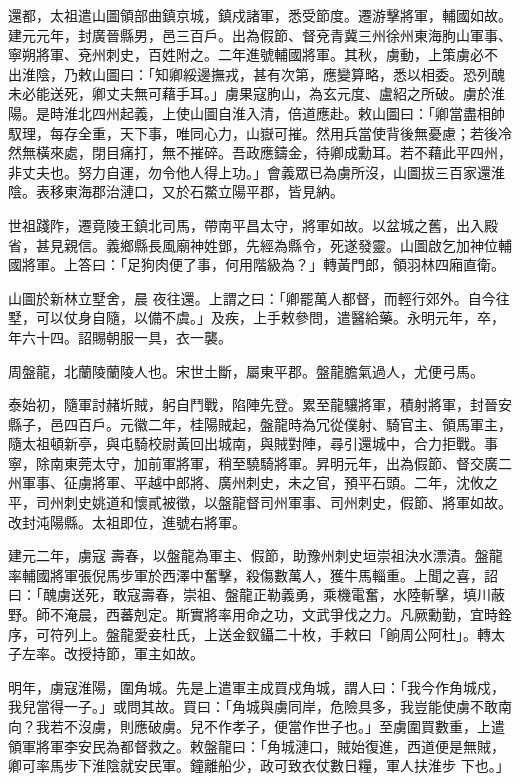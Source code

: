 \begin{pinyinscope}
 還都，太祖遣山圖領部曲鎮京城，鎮戍諸軍，悉受節度。遷游擊將軍，輔國如故。建元元年，封廣晉縣男，邑三百戶。出為假節、督兗青冀三州徐州東海朐山軍事、寧朔將軍、兗州刺史，百姓附之。二年進號輔國將軍。其秋，虜動，上策虜必不
 出淮陰，乃敕山圖曰：「知卿綏邊撫戎，甚有次第，應變算略，悉以相委。恐列醜未必能送死，卿丈夫無可藉手耳。」虜果寇朐山，為玄元度、盧紹之所破。虜於淮陽。是時淮北四州起義，上使山圖自淮入清，倍道應赴。敕山圖曰：「卿當盡相帥馭理，每存全重，天下事，唯同心力，山嶽可摧。然用兵當使背後無憂慮；若後冷然無橫來處，閉目痛打，無不摧碎。吾政應鑄金，待卿成勳耳。若不藉此平四州，非丈夫也。努力自運，勿令他人得上功。」會義眾已為虜所沒，山圖拔三百家還淮陰。表移東海郡治漣口，又於石鱉立陽平郡，皆見納。



 世祖踐阼，遷竟陵王鎮北司馬，帶南平昌太守，將軍如故。以盆城之舊，出入殿省，甚見親信。義鄉縣長風廟神姓鄧，先經為縣令，死遂發靈。山圖啟乞加神位輔國將軍。上答曰：「足狗肉便了事，何用階級為？」轉黃門郎，領羽林四廂直衛。



 山圖於新林立墅舍，晨
 夜往還。上謂之曰：「卿罷萬人都督，而輕行郊外。自今往墅，可以仗身自隨，以備不虞。」及疾，上手敕參問，遣醫給藥。永明元年，卒，年六十四。詔賜朝服一具，衣一襲。



 周盤龍，北蘭陵蘭陵人也。宋世土斷，屬東平郡。盤龍膽氣過人，尤便弓馬。



 泰始初，隨軍討赭圻賊，躬自鬥戰，陷陣先登。累至龍驤將軍，積射將軍，封晉安縣子，邑四百戶。元徽二年，桂陽賊起，盤龍時為冗從僕射、騎官主、領馬軍主，隨太祖頓新亭，與屯騎校尉黃回出城南，與賊對陣，尋引還城中，合力拒戰。事寧，除南東莞太守，加前軍將軍，稍至驍騎將軍。昇明元年，出為假節、督交廣二州軍事、征虜將軍、平越中郎將、廣州刺史，未之官，預平石頭。二年，沈攸之平，司州刺史姚道和懷貳被徵，以盤龍督司州軍事、司州刺史，假節、將軍如故。改封沌陽縣。太祖即位，進號右將軍。



 建元二年，虜寇
 壽春，以盤龍為軍主、假節，助豫州刺史垣崇祖決水漂漬。盤龍率輔國將軍張倪馬步軍於西澤中奮擊，殺傷數萬人，獲牛馬輜重。上聞之喜，詔曰：「醜虜送死，敢寇壽春，崇祖、盤龍正勒義勇，乘機電奮，水陸斬擊，填川蔽野。師不淹晨，西蕃剋定。斯實將率用命之功，文武爭伐之力。凡厥勳勤，宜時銓序，可符列上。盤龍愛妾杜氏，上送金釵鑷二十枚，手敕曰「餉周公阿杜」。轉太子左率。改授持節，軍主如故。



 明年，虜寇淮陽，圍角城。先是上遣軍主成買戍角城，謂人曰：「我今作角城戍，我兒當得一子。」或問其故。買曰：「角城與虜同岸，危險具多，我豈能使虜不敢南向？我若不沒虜，則應破虜。兒不作孝子，便當作世子也。」至虜圍買數重，上遣領軍將軍李安民為都督救之。敕盤龍曰：「角城漣口，賊始復進，西道便是無賊，卿可率馬步下淮陰就安民軍。鐘離船少，政可致衣仗數日糧，軍人扶淮步
 下也。」




\end{pinyinscope}

